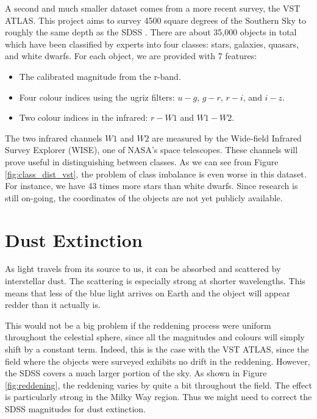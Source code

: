 A second and much smaller dataset comes from a more recent survey, the VST ATLAS. This project aims
to survey 4500 square degrees of the Southern Sky to roughly the same depth as the SDSS
\cite{shanks15}. There are about 35,000 objects in total which have been classified by experts into four
classes: stars, galaxies, quasars, and white dwarfs. For each object, we are provided with 7
features:
	\begin{itemize}
		\item The calibrated magnitude from the r-band.
		\item Four colour indices using the ugriz filters: $u-g$, $g-r$, $r-i$, and $i-z$.
		\item Two colour indices in the infrared: $r-W1$ and $W1-W2$.
	\end{itemize}
The two infrared channels $W1$ and $W2$ are measured by the Wide-field Infrared Survey Explorer
(WISE), one of NASA's space telescopes. These channels will prove useful in distinguishing
between classes. As we can see from Figure \ref{fig:class_dist_vst}, the problem of class
imbalance is even worse in this dataset. For instance, we have 43 times more stars than white
dwarfs. Since research is still on-going, the coordinates of the objects are not yet publicly
available.



\section{Dust Extinction}  
\label{sec:dust}

As light travels from its source to us, it can be absorbed and scattered by interstellar dust. The
scattering is especially strong at shorter wavelengths. This means that less of the blue light
arrives on Earth and the object will appear redder than it actually is.

This would not be a big problem if the reddening process were uniform throughout the
celestial sphere, since all the magnitudes and colours will simply shift by a constant
term. Indeed, this is the case with the VST ATLAS, since the field where the objects were
surveyed exhibits no drift in the reddening.
However, the SDSS covers a much larger portion of the sky. As shown in
Figure \ref{fig:reddening}, the reddening varies by quite a bit throughout the field. The
effect is particularly strong in the Milky Way region. Thus we might need to correct the SDSS
magnitudes for dust extinction.


